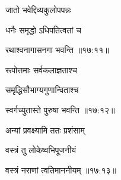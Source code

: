 \nemslokab

{\devanagarifontbold जातो भवेद्दिव्यकुलोपपन्नः  \danda\dontdisplaylinenum }%
 
\nemslokac

{\devanagarifontbold धनैः समृद्धो ऽधिपतित्वतां च }%
  \dontdisplaylinenum    {}%


\nemslokad

{\devanagarifontbold रथाश्वनागासनगा भवन्ति {॥१७:११॥} \veg\dontdisplaylinenum }%

\ujvers{}

\nemslokab

{\devanagarifontbold रूपोत्तमाः सर्वकलाज्ञताश्च  \danda\dontdisplaylinenum }%

\nemslokac

{\devanagarifontbold समृद्धिसौभाग्यगुणान्विताश्च }%
  \dontdisplaylinenum

\nemslokad

{\devanagarifontbold स्वर्गच्युतास्ते पुरुषा भवन्ति {॥१७:१२॥} \veg\dontdisplaylinenum }%
 
\ujvers{}

\nemslokab

{\devanagarifontbold अन्यां प्रवक्ष्यामि ततः प्रशंसाम्  \danda\dontdisplaylinenum }%

\nemslokac

{\devanagarifontbold वस्त्रं तु लोकेष्वभिपूजनीयं }%
  \dontdisplaylinenum    {}%


\nemslokad

{\devanagarifontbold वस्त्रं नराणां त्वतिमाननीयम् {॥१७:१३॥} \veg\dontdisplaylinenum }%
 
\ujvers{}

